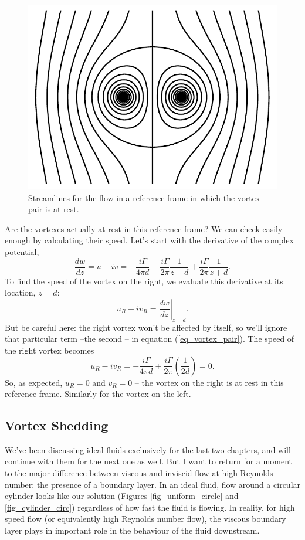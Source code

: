 \begin{figure}
\centering\includegraphics[width=0.7\linewidth]{Figures/Chapter4/fig_vortex_pair3}
\caption{Streamlines for the flow in a reference frame in which the vortex pair is at rest.}
\label{fig_vortex_pair3}
\end{figure}

Are the vortexes actually at rest in this reference frame?  We can check easily enough by calculating their speed.  Let's start with the derivative of the complex potential,
\begin{equation}
\label{eq_vortex_pair}
\frac{dw}{dz} = u - iv = -\frac{i\Gamma}{4 \pi d} - \frac{i\Gamma}{2\pi} \frac{1}{z-d} +  \frac{i\Gamma}{2\pi} \frac{1}{z+d}.
\end{equation}
To find the speed of the vortex on the right, we evaluate this derivative at its location, $z = d$:
\[
u_R - iv_R = \left. \frac{dw}{dz} \right|_{z=d}.
\]
But be careful here: the right vortex won't be affected by itself, so we'll ignore that particular term --the second -- in equation (\ref{eq_vortex_pair}).  The speed of the right vortex becomes
\[
u_R - iv_R = -\frac{i\Gamma}{4\pi d} + \frac{i\Gamma}{2\pi} \left( \frac{1}{2d} \right) = 0.
\]
So, as expected, $u_R = 0$ and $v_R = 0$ -- the vortex on the right is at rest in this reference frame.  Similarly for the vortex on the left.



\subsection{Vortex Shedding}

We've been discussing ideal fluids exclusively for the last two chapters, and will continue with them for the next one as well.  But I want to return for a moment to the major difference between viscous and inviscid flow at high Reynolds number: the presence of a boundary layer.  In an ideal fluid, flow around a circular cylinder looks like our solution (Figures \ref{fig_uniform_circle} and \ref{fig_cylinder_circ}) regardless of how fast the fluid is flowing.  In reality, for high speed flow (or equivalently high Reynolds number flow), the viscous boundary layer plays in important role in the behaviour of the fluid downstream.  

